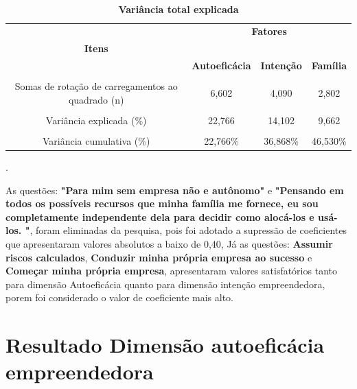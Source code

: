 \begin{table}[!htb]
 \label{tabela_4}
 \centering
\caption{\textbf{Variância total explicada}}
 \\ \hline\hline
\begin{tabular}{c c c c }
\multicolumn{1}{p{6cm}}{} & \multicolumn{3}{c}{\textbf{Fatores}}\\ 
 \multicolumn{1}{c}{\textbf{Itens}} & \multicolumn{3}{c}{\hrulefill}\\ 

 \multicolumn{1}{c}{} 
 &\multicolumn{1}{c}{\textbf{Autoeficácia}} & \multicolumn{1}{c}{\textbf{Intenção}} &\multicolumn{1}{c}{\textbf{Família}}  
\\\\ \hline 

 Somas de rotação de carregamentos ao quadrado (n)
 & 6,602 & 4,090 & 2,802 \\\\
 Variância explicada (\%)
 & 22,766 & 14,102 & 9,662\\\\
 Variância cumulativa (\%)
 & 22,766\% & 36,868\% & 46,530\% \\\hline \hline 
 
\end{tabular}
.
\end{table}



As questões: \textbf{"Para mim sem empresa não e autônomo"} e \textbf{"Pensando em todos os possíveis recursos que minha família me fornece, eu sou completamente independente dela para decidir como alocá-los e usá-los.			
"}, foram eliminadas da pesquisa, pois foi adotado a supressão de coeficientes que apresentaram valores absolutos a baixo de 0,40, Já as questões: \textbf{Assumir riscos calculados}, \textbf{Conduzir minha própria empresa ao sucesso} e \textbf{Começar minha própria empresa}, apresentaram valores satisfatórios tanto para dimensão Autoeficácia quanto para dimensão intenção empreendedora, porem foi considerado o valor de coeficiente mais alto.



\section{Resultado Dimensão autoeficácia empreendedora}


